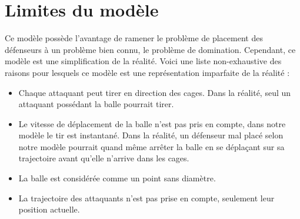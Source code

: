 \section{Limites du modèle}

Ce modèle possède l'avantage de ramener le problème de placement des défenseurs à un problème bien connu, le problème de domination. Cependant, ce modèle est une simplification de la réalité. Voici une liste non-exhaustive des raisons pour lesquels ce modèle est une représentation imparfaite de la réalité :

\begin{itemize}
    \item Chaque attaquant peut tirer en direction des cages. Dans la réalité, seul un attaquant possédant la balle pourrait tirer.
    \item Le vitesse de déplacement de la balle n'est pas pris en compte, dans notre modèle le tir est instantané. Dans la réalité, un défenseur mal placé selon notre modèle pourrait quand même arrêter la balle en se déplaçant sur sa trajectoire avant qu'elle n'arrive dans les cages.
    \item La balle est considérée comme un point sans diamètre.
    \item La trajectoire des attaquants n'est pas prise en compte, seulement leur position actuelle.
\end{itemize}